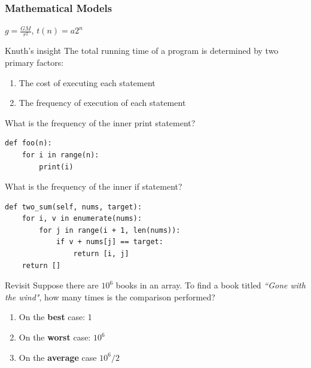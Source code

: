 \documentclass[aspectratio=169, 14pt]{beamer}
\begin{document}
\begin{frame}
    \frametitle{Mathematical Models}
\(g = \frac{GM}{r^2}\), \(t(n) = a2^{n}\)

\begin{exampleblock}{Knuth's insight}
The total running time of a program is determined by two primary factors:
\begin{enumerate}
    \item The cost of executing each statement
    \item The frequency of execution of each statement
\end{enumerate}
\end{exampleblock}
\end{frame}

\begin{frame}[fragile]
What is the frequency of the inner \alert{print} statement?
\begin{verbatim}
def foo(n):
    for i in range(n):
        print(i)
\end{verbatim}
\pause
What is the frequency of the inner \alert{if} statement?
\begin{verbatim}
def two_sum(self, nums, target):
    for i, v in enumerate(nums):
        for j in range(i + 1, len(nums)):
            if v + nums[j] == target:
                return [i, j]
    return []
\end{verbatim}
\end{frame}

\begin{frame}
    \begin{block}{Revisit}
        Suppose there are $10^6$ books in an array. To find a book titled \emph{``Gone with the wind"}, how many times is the comparison performed?
        \begin{enumerate}
            \item On the \textbf{best} case: 1 
            \item On the \textbf{worst} case: $10^6$
            \item On the \textbf{average} case $10^6/2$
        \end{enumerate}
    \end{block}
\end{frame}
\end{document}
